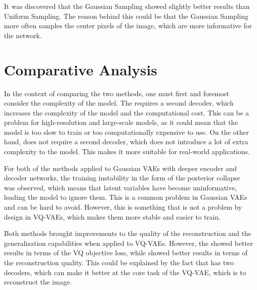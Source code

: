 It was discovered that the Gaussian Sampling showed slightly better results than Uniform Sampling. The reason behind this could be that the Gaussian Sampling more often samples the center pixels of the image, which are more informative for the network.

\section{Comparative Analysis}

In the context of comparing the two methods, one must first and foremost consider the complexity of the model. The  requires a second decoder,
which increases the complexity of the model and the computational cost. This can be a problem for high-resolution and large-scale models, as it could mean that the model is too slow to train or too computationally expensive to use. On the other hand,  does not require a second decoder, which does not introduce a lot of extra complexity to the model. This makes it more suitable for real-world applications.

For both of the methods applied to Gaussian VAEs with deeper encoder and decoder networks, the training instability in the form of the posterior collapse was observed, which means that latent variables have become uninformative, leading the model to ignore them. This is a common problem in Gaussian VAEs and can be hard to avoid. However, this is something that is not a problem by design in VQ-VAEs, which makes them more stable and easier to train.

Both methods brought improvements to the quality of the reconstruction and the generalization capabilities when applied to VQ-VAEs. However, the  showed better results in terms of the VQ objective loss, while  showed better results in terms of the reconstruction quality. This could be explained by the fact that  has two decoders, which can make it better at the core task of the VQ-VAE, which is to reconstruct the image.



